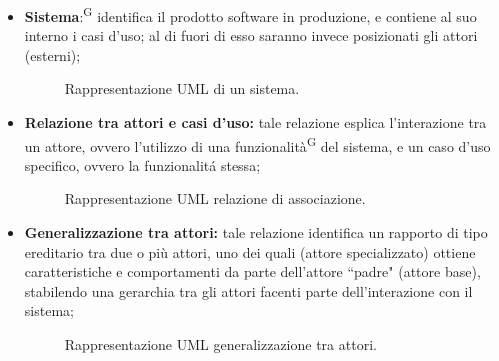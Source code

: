 \documentclass[8pt]{article}
\newcommand{\glossterm}[1]{#1\textsuperscript{G}} %
\begin{document}
\begin{itemize}
\item \glossterm{\textbf{Sistema}:} identifica il prodotto software in produzione, e contiene al suo interno i casi d'uso; al di fuori di esso saranno invece posizionati gli attori (esterni);
        \begin{figure}[H]
            \centering
            \caption{Rappresentazione UML di un sistema.}
            \label{fig:Rappresentazione UML di un sistema}
        \end{figure}
    \item \textbf{Relazione tra attori e casi d'uso:} tale relazione esplica l'interazione tra un attore, ovvero l'utilizzo di una \glossterm{funzionalità} del sistema, e un caso d'uso specifico, ovvero la funzionalitá stessa;
        \begin{figure}[H]
            \centering
            \caption{Rappresentazione UML relazione di associazione.}
            \label{fig:Rappresentazione UML relazione di associazione}
        \end{figure}
    \item \textbf{Generalizzazione tra attori:} tale relazione identifica un rapporto di tipo ereditario tra due o più attori, uno dei quali (attore specializzato) ottiene caratteristiche e comportamenti da parte dell'attore ``padre" (attore base), stabilendo una gerarchia tra gli attori facenti parte dell'interazione con il sistema;
        \begin{figure}[H]
            \centering
            \caption{Rappresentazione UML generalizzazione tra attori.}
            \label{fig:Rappresentazione UML generalizzazione tra attori}

\end{figure}
\end{itemize}
\end{document}
